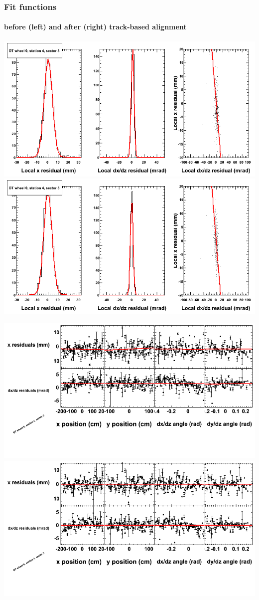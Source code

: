 \documentclass[compress]{beamer}
\begin{document}
\begin{frame}
\frametitle{Fit functions}
\framesubtitle{before (left) and after (right) track-based alignment}
\includegraphics[width=0.5\linewidth]{fitfunctions_re01/MBwhCst4sec03_bellcurves.png} \includegraphics[width=0.5\linewidth]{fitfunctions_re05/MBwhCst4sec03_bellcurves.png}

\includegraphics[width=0.5\linewidth]{fitfunctions_re01/MBwhCst4sec03_polynomials.png} \includegraphics[width=0.5\linewidth]{fitfunctions_re05/MBwhCst4sec03_polynomials.png}
\end{frame}
\end{document}
